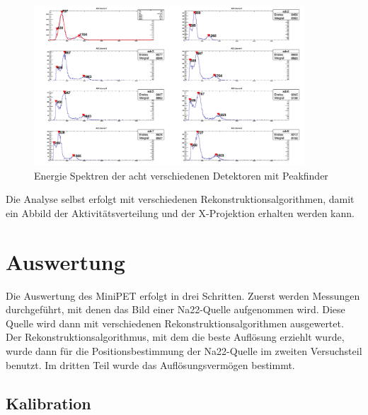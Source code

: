 \begin{figure}[h!]
	\centering
	\includegraphics[width=0.9\textwidth]{Energiekalibration.png}
	\caption{Energie Spektren der acht verschiedenen Detektoren mit Peakfinder}
	\label{Kali}
\end{figure}

Die Analyse selbst erfolgt mit verschiedenen Rekonstruktionsalgorithmen, damit ein Abbild der Aktivitätsverteilung und der X-Projektion erhalten werden kann.

\section{Auswertung}
Die Auswertung des MiniPET erfolgt in drei Schritten.
Zuerst werden Messungen durchgeführt, mit denen das Bild einer Na22-Quelle aufgenommen wird. Diese Quelle wird dann mit verschiedenen Rekonstruktionsalgorithmen ausgewertet. Der Rekonstruktionsalgorithmus, mit dem die beste Auflösung erziehlt wurde, wurde dann für die Positionsbestimmung der Na22-Quelle im zweiten Versuchsteil benutzt.
Im dritten Teil wurde das Auflösungsvermögen bestimmt.
\subsection{Kalibration}

